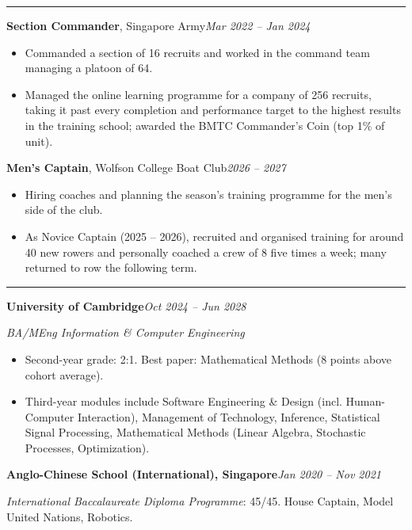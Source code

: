 \documentclass[11pt]{article}
\newcommand{\cvsection}[1]{%
  \vspace{10pt}%
  \noindent{\large\bfseries\MakeUppercase{#1}}\par
  \vspace{-4pt}\noindent\rule{\linewidth}{0.7pt}\vspace{4pt}%
}
\begin{document}
\cvsection{Leadership}
\noindent\textbf{Section Commander}, Singapore Army\hfill\textit{Mar 2022 -- Jan 2024}\par
\begin{itemize}
  \item Commanded a section of 16 recruits and worked in the command team managing a platoon of 64.
  \item Managed the online learning programme for a company of 256 recruits, taking it past every completion and performance target to the highest results in the training school; awarded the BMTC Commander's Coin (top 1\% of unit).
\end{itemize}

\vspace{4pt}
\newpage
\noindent\textbf{Men's Captain}, Wolfson College Boat Club\hfill\textit{2026 -- 2027}\par
\begin{itemize}
  \item Hiring coaches and planning the season's training programme for the men's side of the club.
  \item As Novice Captain (2025 -- 2026), recruited and organised training for around 40 new rowers and personally coached a crew of 8 five times a week; many returned to row the following term.
\end{itemize}

\cvsection{Education}

\noindent\textbf{University of Cambridge}\hfill\textit{Oct 2024 -- Jun 2028}\par
\textit{BA/MEng Information \& Computer Engineering}
\begin{itemize}
  \item Second-year grade: 2:1. Best paper: Mathematical Methods (8 points above cohort average).
  \item Third-year modules include Software Engineering \& Design (incl. Human-Computer Interaction), Management of Technology, Inference, Statistical Signal Processing, Mathematical Methods (Linear Algebra, Stochastic Processes, Optimization).
\end{itemize}

\vspace{4pt}
\noindent\textbf{Anglo-Chinese School (International), Singapore}\hfill\textit{Jan 2020 -- Nov 2021}\par
\textit{International Baccalaureate Diploma Programme}: 45/45. House Captain, Model United Nations, Robotics.
\end{document}

